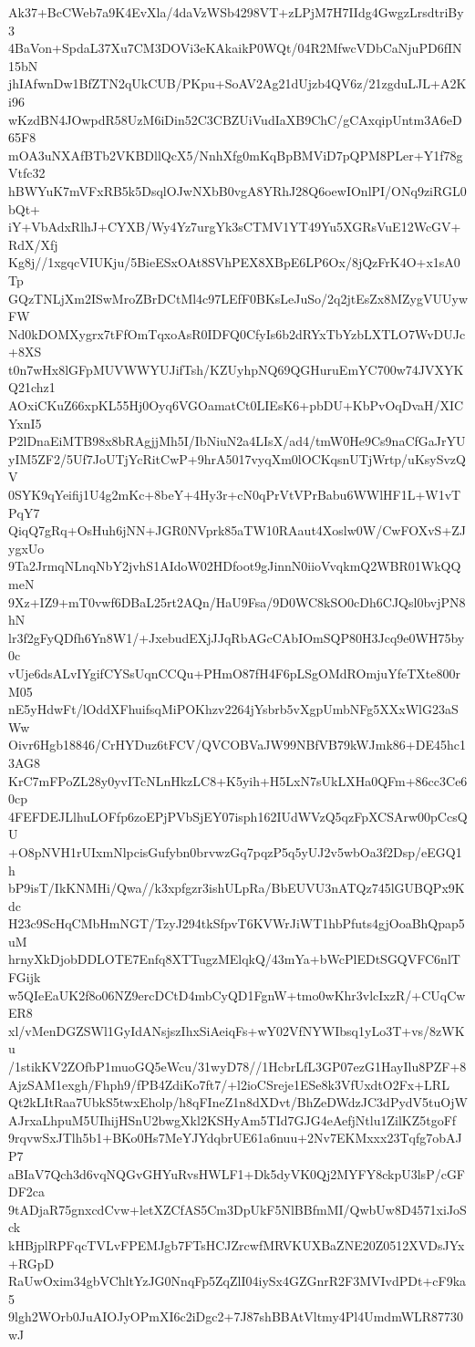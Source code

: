 Ak37+BcCWeb7a9K4EvXla/4daVzWSb4298VT+zLPjM7H7IIdg4GwgzLrsdtriBy3
4BaVon+SpdaL37Xu7CM3DOVi3eKAkaikP0WQt/04R2MfwcVDbCaNjuPD6fIN15bN
jhIAfwnDw1BfZTN2qUkCUB/PKpu+SoAV2Ag21dUjzb4QV6z/21zgduLJL+A2Ki96
wKzdBN4JOwpdR58UzM6iDin52C3CBZUiVudIaXB9ChC/gCAxqipUntm3A6eD65F8
mOA3uNXAfBTb2VKBDllQcX5/NnhXfg0mKqBpBMViD7pQPM8PLer+Y1f78gVtfc32
hBWYuK7mVFxRB5k5DsqlOJwNXbB0vgA8YRhJ28Q6oewIOnlPI/ONq9ziRGL0bQt+
iY+VbAdxRlhJ+CYXB/Wy4Yz7urgYk3sCTMV1YT49Yu5XGRsVuE12WcGV+RdX/Xfj
Kg8j//1xgqcVIUKju/5BieESxOAt8SVhPEX8XBpE6LP6Ox/8jQzFrK4O+x1sA0Tp
GQzTNLjXm2ISwMroZBrDCtMl4c97LEfF0BKsLeJuSo/2q2jtEsZx8MZygVUUywFW
Nd0kDOMXygrx7tFfOmTqxoAsR0IDFQ0CfyIs6b2dRYxTbYzbLXTLO7WvDUJc+8XS
t0n7wHx8lGFpMUVWWYUJifTsh/KZUyhpNQ69QGHuruEmYC700w74JVXYKQ21chz1
AOxiCKuZ66xpKL55Hj0Oyq6VGOamatCt0LIEsK6+pbDU+KbPvOqDvaH/XICYxnI5
P2lDnaEiMTB98x8bRAgjjMh5I/IbNiuN2a4LIsX/ad4/tmW0He9Cs9naCfGaJrYU
yIM5ZF2/5Uf7JoUTjYcRitCwP+9hrA5017vyqXm0lOCKqsnUTjWrtp/uKsySvzQV
0SYK9qYeifij1U4g2mKc+8beY+4Hy3r+cN0qPrVtVPrBabu6WWlHF1L+W1vTPqY7
QiqQ7gRq+OsHuh6jNN+JGR0NVprk85aTW10RAaut4Xoslw0W/CwFOXvS+ZJygxUo
9Ta2JrmqNLnqNbY2jvhS1AIdoW02HDfoot9gJinnN0iioVvqkmQ2WBR01WkQQmeN
9Xz+IZ9+mT0vwf6DBaL25rt2AQn/HaU9Fsa/9D0WC8kSO0cDh6CJQsl0bvjPN8hN
lr3f2gFyQDfh6Yn8W1/+JxebudEXjJJqRbAGcCAbIOmSQP80H3Jcq9e0WH75by0c
vUje6dsALvIYgifCYSsUqnCCQu+PHmO87fH4F6pLSgOMdROmjuYfeTXte800rM05
nE5yHdwFt/lOddXFhuifsqMiPOKhzv2264jYsbrb5vXgpUmbNFg5XXxWlG23aSWw
Oivr6Hgb18846/CrHYDuz6tFCV/QVCOBVaJW99NBfVB79kWJmk86+DE45hc13AG8
KrC7mFPoZL28y0yvITcNLnHkzLC8+K5yih+H5LxN7sUkLXHa0QFm+86cc3Ce60cp
4FEFDEJLlhuLOFfp6zoEPjPVbSjEY07isph162IUdWVzQ5qzFpXCSArw00pCcsQU
+O8pNVH1rUIxmNlpcisGufybn0brvwzGq7pqzP5q5yUJ2v5wbOa3f2Dsp/eEGQ1h
bP9isT/IkKNMHi/Qwa//k3xpfgzr3ishULpRa/BbEUVU3nATQz745lGUBQPx9Kdc
H23c9ScHqCMbHmNGT/TzyJ294tkSfpvT6KVWrJiWT1hbPfuts4gjOoaBhQpap5uM
hrnyXkDjobDDLOTE7Enfq8XTTugzMElqkQ/43mYa+bWcPlEDtSGQVFC6nlTFGijk
w5QIeEaUK2f8o06NZ9ercDCtD4mbCyQD1FgnW+tmo0wKhr3vlcIxzR/+CUqCwER8
xl/vMenDGZSWl1GyIdANsjszIhxSiAeiqFs+wY02VfNYWIbsq1yLo3T+vs/8zWKu
/1stikKV2ZOfbP1muoGQ5eWcu/31wyD78//1HcbrLfL3GP07ezG1HayIlu8PZF+8
AjzSAM1exgh/Fhph9/fPB4ZdiKo7ft7/+l2ioCSreje1ESe8k3VfUxdtO2Fx+LRL
Qt2kLItRaa7UbkS5twxEholp/h8qFIneZ1n8dXDvt/BhZeDWdzJC3dPydV5tuOjW
AJrxaLhpuM5UIhijHSnU2bwgXkl2KSHyAm5TId7GJG4eAefjNtlu1ZilKZ5tgoFf
9rqvwSxJTlh5b1+BKo0Hs7MeYJYdqbrUE61a6nuu+2Nv7EKMxxx23Tqfg7obAJP7
aBIaV7Qch3d6vqNQGvGHYuRvsHWLF1+Dk5dyVK0Qj2MYFY8ckpU3lsP/cGFDF2ca
9tADjaR75gnxcdCvw+letXZCfAS5Cm3DpUkF5NlBBfmMI/QwbUw8D4571xiJoSck
kHBjplRPFqcTVLvFPEMJgb7FTsHCJZrcwfMRVKUXBaZNE20Z0512XVDsJYx+RGpD
RaUwOxim34gbVChltYzJG0NnqFp5ZqZlI04iySx4GZGnrR2F3MVIvdPDt+cF9ka5
9lgh2WOrb0JuAIOJyOPmXI6c2iDgc2+7J87shBBAtVltmy4Pl4UmdmWLR87730wJ
